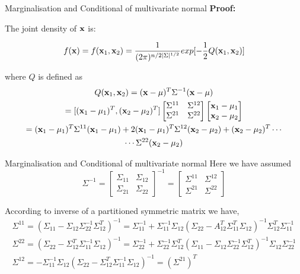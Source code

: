 \documentclass{beamer}
\begin{document}
\begin{frame}{Marginalisation and Conditional of multivariate normal}
	\textbf{Proof:}
	
	The joint density of ${\bf x}$ is:
	
	\begin{equation}
	f({\bf x})=f({\bf x}_1,{\bf x}_2)=\frac{1}{(2\pi)^{n/2\vert\Sigma\vert^{1/2}}}exp[-\frac{1}{2}Q({\bf x}_1,{\bf x}_2)] 
	\end{equation}
	
	where $Q$ is defined as
	\begin{gather}
	Q({\bf x}_1,{\bf x}_2) = ({\bf x}-\mu)^T\Sigma^{-1}({\bf x}-\mu)\\
	= [({\bf x}_1-\mu_1)^T, ({\bf x}_2-\mu_2)^T] 
	\begin{bmatrix}
	\Sigma^{11} & \Sigma^{12}\\
	\Sigma^{21} & \Sigma^{22}
	\end{bmatrix}
	\begin{bmatrix}
	{\bf x}_1-\mu_1 \\
	{\bf x}_2-\mu_2
	\end{bmatrix}\\
	= ({\bf x}_1-\mu_1)^T\Sigma^{11}({\bf x}_1-\mu_1)+ 2({\bf x}_1-\mu_1)^T\Sigma^{12}({\bf x}_2-\mu_2) + ({\bf x}_2-\mu_2)^T \cdots \\
	\cdots \Sigma^{22}({\bf x}_2-\mu_2)
	\end{gather}
\end{frame}

\begin{frame}{Marginalisation and Conditional of multivariate normal}
	Here we have assumed 
	$$	
	\Sigma^{-1}=\left[\begin{array}{cc}
	{\Sigma_{11}} & {\Sigma_{12}} \\
	{\Sigma_{21}} & {\Sigma_{22}}
	\end{array}\right]^{-1}=\left[\begin{array}{cc}
	{\Sigma^{11}} & {\Sigma^{12}} \\
	{\Sigma^{21}} & {\Sigma^{22}}
	\end{array}\right]
	$$
	
	According to inverse of a partitioned symmetric matrix we have, 
	\begin{gather}
	\Sigma^{11}=\left(\Sigma_{11}-\Sigma_{12} \Sigma_{22}^{-1} \Sigma_{12}^{T}\right)^{-1}=\Sigma_{11}^{-1}+\Sigma_{11}^{-1} \Sigma_{12}\left(\Sigma_{22}-A_{12}^{T} \Sigma_{11}^{T} \Sigma_{12}\right)^{-1} \Sigma_{12}^{T} \Sigma_{11}^{-1}\\
	\Sigma^{22}=\left(\Sigma_{22}-\Sigma_{12}^{T} \Sigma_{11}^{-1} \Sigma_{12}\right)^{-1}=\Sigma_{22}^{-1}+\Sigma_{22}^{-1} \Sigma_{12}^{T}\left(\Sigma_{11}-\Sigma_{12} \Sigma_{22}^{-1} \Sigma_{12}^{T}\right)^{-1} \Sigma_{12} \Sigma_{22}^{-1}\\
	\Sigma^{12}=-\Sigma_{11}^{-1} \Sigma_{12}\left(\Sigma_{22}-\Sigma_{12}^{T} \Sigma_{11}^{-1} \Sigma_{12}\right)^{-1}=\left(\Sigma^{21}\right)^{T}
	\end{gather}
	
\end{frame}
\end{document}
